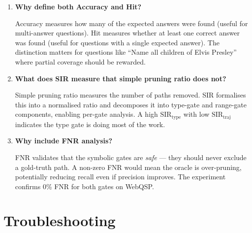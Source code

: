 \documentclass[11pt,a4paper,oneside,openany]{book}
\theoremstyle{definition}
\begin{document}
\begin{enumerate}

	\item \textbf{Why define both Accuracy and Hit?}

	      Accuracy measures how many of the expected answers were found (useful for multi-answer questions). Hit measures whether at least one correct answer was found (useful for questions with a single expected answer). The distinction matters for questions like ``Name all children of Elvis Presley'' where partial coverage should be rewarded.

	\item \textbf{What does SIR measure that simple pruning ratio does not?}

	      Simple pruning ratio measures the number of paths removed. SIR formalises this into a normalised ratio and decomposes it into type-gate and range-gate components, enabling per-gate analysis. A high $\text{SIR}_{\text{type}}$ with low $\text{SIR}_{\text{traj}}$ indicates the type gate is doing most of the work.

	\item \textbf{Why include FNR analysis?}

	      FNR validates that the symbolic gates are \emph{safe} --- they should never exclude a gold-truth path. A non-zero FNR would mean the oracle is over-pruning, potentially reducing recall even if precision improves. The experiment confirms 0\% FNR for both gates on WebQSP.

\end{enumerate}

\section{Troubleshooting}
\end{document}
